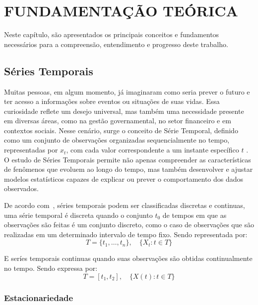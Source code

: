 \chapter{FUNDAMENTAÇÃO TEÓRICA}
Neste capítulo, são apresentados os principais conceitos e fundamentos necessários para a compreensão, 
entendimento e progresso deste trabalho.


\section{Séries Temporais}
    Muitas pessoas, em algum momento, já imaginaram como seria prever o futuro e ter acesso a informações sobre eventos 
    ou situações de suas vidas. Essa curiosidade reflete um desejo universal, mas também uma necessidade presente em 
    diversas áreas, como na gestão governamental, no setor financeiro e em contextos sociais. Nesse cenário, surge o 
    conceito de Série Temporal, definido como um conjunto de observações organizadas sequencialmente no tempo, 
    representadas por \( x_t \), com cada valor correspondente a um instante específico \(t\) \cite{box2015}. O estudo de 
    Séries Temporais permite não apenas compreender as características de fenômenos que evoluem ao longo do tempo, mas 
    também desenvolver e ajustar modelos estatísticos capazes de explicar ou prever o comportamento dos dados 
    observados.
    
    De acordo com~\cite{brockwell2002}, séries temporais podem ser classificadas 
    discretas e continuas, uma série temporal é discreta quando o conjunto \( t_0 \) de tempos em que as observações 
    são feitas é um conjunto discreto, como o caso de observações que são realizadas em um determinado intervalo de 
    tempo fixo. Sendo representada por:
    \begin{equation}
        T = \{t_1, \dots, t_n\}, \quad \{X_t : t \in T\}
    \end{equation}
    
    
    
    E seríes temporais continuas quando suas observações são obtidas continualmente 
    no tempo. Sendo expressa por: 
    \begin{equation}
        T = [t_1, t_2], \quad \{X(t) : t \in T\}
    \end{equation}
        

    

    \subsection{Estacionariedade}
